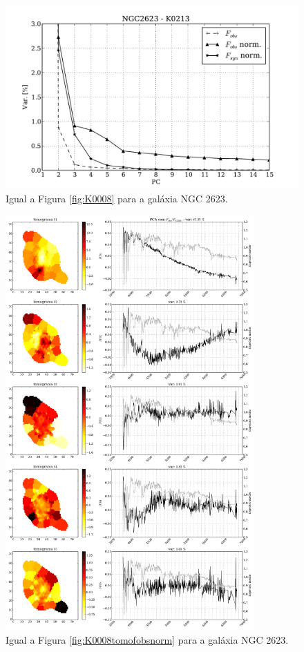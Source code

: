 \begin{figure}
    \includegraphics[height=0.33\textheight]{figuras/K0213-screetest.pdf}
    \caption[Scree test comparativo entre 3 PCAs - NGC 2623.]
    {Igual a Figura \ref{fig:K0008} para a galáxia NGC 2623.}
    \label{fig:K0213scree}
\end{figure}

\begin{figure}
    \includegraphics[width=0.85\textwidth]{figuras/K0213-tomo-obs-norm.pdf}
    \caption[Tomogramas de 1 a 5 para o cubo $F_{obs}$ norm. - NGC 2623.]
    {Igual a Figura \ref{fig:K0008tomofobsnorm} para a galáxia NGC 2623.}
    \label{fig:K0213tomofobsnorm}
\end{figure}

